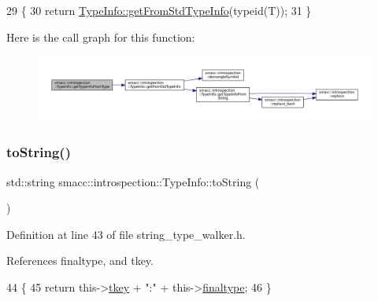 \begin{DoxyCode}
29     \{
30         \textcolor{keywordflow}{return} \hyperlink{classsmacc_1_1introspection_1_1TypeInfo_ada1e604cd8bf968a5f816fbace4af881}{TypeInfo::getFromStdTypeInfo}(\textcolor{keyword}{typeid}(T));
31     \}
\end{DoxyCode}
Here is the call graph for this function\+:
\nopagebreak
\begin{figure}[H]
\begin{center}
\leavevmode
\includegraphics[width=350pt]{classsmacc_1_1introspection_1_1TypeInfo_a8716ca6ac890b4582986d9fe4f5962ad_cgraph}
\end{center}
\end{figure}
\mbox{\label{classsmacc_1_1introspection_1_1TypeInfo_a41eb6c64f46a8e24a206e5702c6f6818}} 
\subsubsection{\texorpdfstring{to\+String()}{toString()}}
{\footnotesize\ttfamily std\+::string smacc\+::introspection\+::\+Type\+Info\+::to\+String (\begin{DoxyParamCaption}{ }\end{DoxyParamCaption})\hspace{0.3cm}{\ttfamily [inline]}}



Definition at line 43 of file string\+\_\+type\+\_\+walker.\+h.



References finaltype, and tkey.


\begin{DoxyCode}
44     \{
45         \textcolor{keywordflow}{return} this->\hyperlink{classsmacc_1_1introspection_1_1TypeInfo_a697dd505119258dba1224d10eea5b2bd}{tkey} + \textcolor{stringliteral}{":"} + this->\hyperlink{classsmacc_1_1introspection_1_1TypeInfo_aa4010ed427e12db443e08ab16a3de243}{finaltype};
46     \}
\end{DoxyCode}


